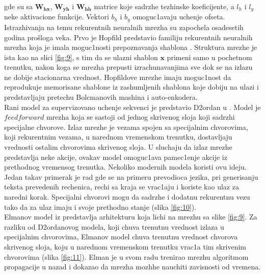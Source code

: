 \documentclass[a4paper, openany, oneside, 11pt]{book}
\begin{document}
gde su sa $\mathbf{W_{hx}}$, $\mathbf{W_{yh}}$ i $\mathbf{W_{hh}}$ matrice koje sadrzhe tezhinske koeficijente, a $l_h$ i $l_y$ neke aktivacione funkcije. Vektori $b_h$ i $b_y$ omoguc1avaju uchenje ofseta.\\
Istrazhivanja na temu rekurentnih neuralnih mrezha su zapochela osadesetih godina prošloga veka. Prvo je Hopfild predstavio familiju rekurentnih neuralnih mrezha koja je imala moguc1nosti prepoznavanja shablona \cite{Hopfild}. Struktura mrezhe je ista kao na slici \ref{fig:9}, s tim da se ulazni shablon $\mathbf{x}$ primeni samo u pochetnom trenutku, nakon koga se mrezha prepusti izrachunavanjima  sve dok se na izlazu ne dobije stacionarna vrednost. Hopfildove mrezhe imaju moguc1nost da reprodukuje memorisane shablone iz zashumljenih shablona koje dobiju na ulazi i predstavljaju pretechu Bolcmanovih mashina i auto-enkodera.\\
Rani model za supervizovano uchenje sekvenci je predstavio D2ordan u \cite{jordan}. Model je $feedforward$ mrezha koja se sastoji od jednog skrivenog sloja koji sadrzhi specijalne chvorove. Izlaz mrezhe je vezama spojen sa specijalnim chvorovima, koji rekurentnim vezama, u narednom vremenskom trenutku, dostavljaju vrednosti ostalim chvorovima skrivenog sloja. U sluchaju da izlaz mrezhe predstavlja neke akcije, ovakav model omoguc1ava pamec1enje akcije iz prethodnog vremensog trenutka. Nekoliko modernih modela koristi ovu ideju. Jedan takav primerak je rad \cite{Sutskever} gde se na primeru prevodioca jezika, pri generisanju teksta prevedenih rechenica, rechi sa kraja se vrac1aju i koriste kao ulaz za naredni korak. Specijalni chvorovi mogu da sadrzhe i dodatnu rekurentnu vezu tako da za ulaz imaju i svoje prethodno stanje (slika \ref{fig:10}).\\
Elmanov model iz \cite{Elman} predstavlja arhitekturu koja lichi na mrezhu sa slike \ref{fig:9}. Za razliku od D2ordanovog modela, koji chuva trenutnu vrednost izlaza u specijalnim chvorovima, Elmanov model chuva trenutnu vrednost chvorova skrivenog sloja, koju u narednom vremenskom trenutku vrac1a tim skrivenim chvorovima (slika \ref{fig:11}). Elman je u svom radu trenirao mrezhu algoritmom propagacije u nazad i dokazao da mrezha mozhhe nauchiti zavisnosti od vremena.
\newpage
\end{document}
